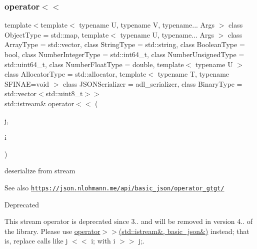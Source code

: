 \subsubsection{\texorpdfstring{operator$<$$<$}{operator<<}\hspace{0.1cm}{\footnotesize\ttfamily [2/2]}}
{\footnotesize\ttfamily template$<$template$<$ typename U, typename V, typename... Args $>$ class Object\+Type = std\+::map, template$<$ typename U, typename... Args $>$ class Array\+Type = std\+::vector, class String\+Type  = std\+::string, class Boolean\+Type  = bool, class Number\+Integer\+Type  = std\+::int64\+\_\+t, class Number\+Unsigned\+Type  = std\+::uint64\+\_\+t, class Number\+Float\+Type  = double, template$<$ typename U $>$ class Allocator\+Type = std\+::allocator, template$<$ typename T, typename S\+F\+I\+N\+A\+E=void $>$ class J\+S\+O\+N\+Serializer = adl\+\_\+serializer, class Binary\+Type  = std\+::vector$<$std\+::uint8\+\_\+t$>$$>$ \\
std\+::istream\& operator$<$$<$ (\begin{DoxyParamCaption}\item[{\hyperlink{classnlohmann_1_1basic__json}{basic\+\_\+json}$<$ Object\+Type, Array\+Type, String\+Type, Boolean\+Type, Number\+Integer\+Type, Number\+Unsigned\+Type, Number\+Float\+Type, Allocator\+Type, J\+S\+O\+N\+Serializer, Binary\+Type $>$ \&}]{j,  }\item[{std\+::istream \&}]{i }\end{DoxyParamCaption})\hspace{0.3cm}{\ttfamily [friend]}}



deserialize from stream 

\begin{DoxySeeAlso}{See also}
\href{https://json.nlohmann.me/api/basic_json/operator_gtgt/}{\tt https\+://json.\+nlohmann.\+me/api/basic\+\_\+json/operator\+\_\+gtgt/} 
\end{DoxySeeAlso}
\begin{DoxyRefDesc}{Deprecated}
\item[\hyperlink{deprecated__deprecated000005}{Deprecated}]This stream operator is deprecated since 3.. and will be removed in version 4.. of the library. Please use \hyperlink{classnlohmann_1_1basic__json_aaf363408931d76472ded14017e59c9e8}{operator$>$$>$(std\+::istream\&, basic\+\_\+json\&)} instead; that is, replace calls like {\ttfamily j $<$$<$ i;} with {\ttfamily i $>$$>$ j;}. \end{DoxyRefDesc}
\mbox{\label{classnlohmann_1_1basic__json_a5c8bb5200f5eac10d31e26be46e5b1ac}} 
